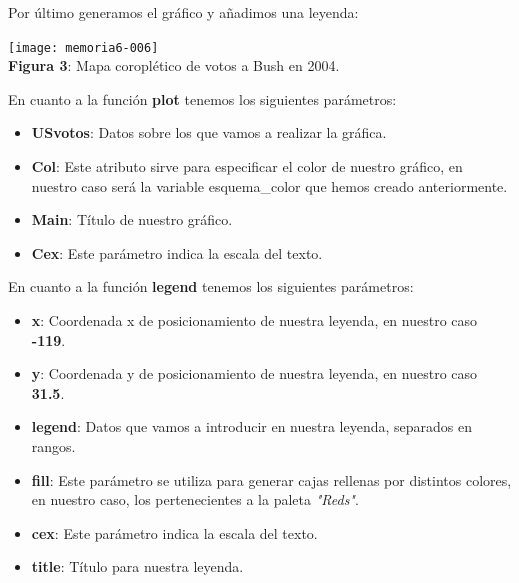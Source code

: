 \documentclass [a4paper] {article}
\begin{document}
Por último generamos el gráfico y añadimos una leyenda:

\begin{center}
\begin{Schunk}
\end{Schunk}
\texttt{[image: memoria6-006]}
\\\textbf{Figura 3}: Mapa coroplético de votos a Bush en 2004.
\end{center}

En cuanto a la función \textbf{plot} tenemos los siguientes parámetros:
\begin{itemize} 
  \item \textbf{USvotos}: Datos sobre los que vamos a realizar la gráfica.
  \item \textbf{Col}: Este atributo sirve para especificar el color de nuestro gráfico, en nuestro caso será la variable esquema\_color 
  que hemos creado anteriormente.
  \item \textbf{Main}: Título de nuestro gráfico.
  \item \textbf{Cex}: Este parámetro indica la escala del texto.
\end{itemize}

En cuanto a la función \textbf{legend} tenemos los siguientes parámetros:
\begin{itemize} 
  \item \textbf{x}: Coordenada x de posicionamiento de nuestra leyenda, en nuestro caso \textbf{-119}.
  \item \textbf{y}: Coordenada y de posicionamiento de nuestra leyenda, en nuestro caso \textbf{31.5}.
  \item \textbf{legend}: Datos que vamos a introducir en nuestra leyenda, separados en rangos.
  \item \textbf{fill}: Este parámetro se utiliza para generar cajas rellenas por distintos colores, en nuestro caso, los 
  pertenecientes a la paleta \textit{"Reds"}.
  \item \textbf{cex}: Este parámetro indica la escala del texto.
  \item \textbf{title}: Título para nuestra leyenda.
\end{itemize}
\end{document}
